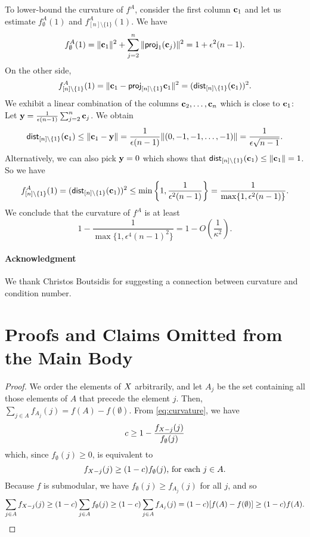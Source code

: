 \documentclass{article}
\theoremstyle{definition}
\begin{document}
To lower-bound the curvature of $f^A$, consider the first column $\mathbf c_1$ and let us estimate $f^A_\emptyset(1)$ and $f^A_{[n]\setminus \{1\}}(1)$. We have
$$ f^A_\emptyset(1) = \| \mathbf c_1 \|^2 + \sum_{j=2}^{n} \| \mathsf{proj}_1(\mathbf c_j) \|^2 = 1 + \epsilon^2 (n-1).$$
On the other side,
$$ f^A_{[n] \setminus \{1\}}(1) = \| \mathbf c_1 - \mathsf{proj}_{[n] \setminus \{1\}} \mathbf c_1 \|^2 = (\mathsf{dist}_{[n] \setminus \{1\}}(\mathbf c_1))^2. $$
We exhibit a linear combination of the columns $\mathbf c_2,\ldots,\mathbf c_n$ which is close to $\mathbf c_1$: Let $\mathbf y = \frac{1}{\epsilon(n-1)} \sum_{j=2}^{n} \mathbf c_j$. 
We obtain
$$ \mathsf{dist}_{[n] \setminus \{1\}} (\mathbf c_1) \leq \| \mathbf c_1 - \mathbf y \| 
 = \frac{1}{\epsilon (n-1)} \| (0,-1,-1,\ldots,-1) \|
= \frac{1}{\epsilon \sqrt{n-1}}.$$
Alternatively, we can also pick $\mathbf y = 0$ which shows that $\mathsf{dist}_{[n] \setminus \{1\}}(\mathbf c_1) \leq \| \mathbf c_1 \| = 1$. So we have
$$ f^A_{[n] \setminus \{1\}}(1) = (\mathsf{dist}_{[n] \setminus \{1\}}(\mathbf c_1))^2  \leq \min \left\{1, \frac{1}{\epsilon^2 (n-1)} \right\} 
 = \frac{1}{\max \{1, \epsilon^2 (n-1) \}}. $$
We conclude that the curvature of $f^A$ is at least $$1 - \frac{1}{\max \{1, \epsilon^4 (n-1)^2\}} = 1 - O\left(\frac{1}{\kappa^2}\right).$$

\paragraph{Acknowledgment}
We thank Christos Boutsidis for suggesting a connection between curvature and condition number.




\appendix



\section{Proofs and Claims Omitted from the Main Body}
\label{sec:omitt-proofs-claims}

\submodcurv*
\begin{proof}
We order the elements of $X$ arbitrarily, and let $A_{j}$ be the set containing all those elements of $A$ that precede the element $j$.  Then, $\sum_{j \in A}f_{A_{j}}(j) = f(A) - f(\emptyset)$.  From \eqref{eq:curvature}, we have
\[
c \ge 1- \frac{f_{X-j}(j)}{f_{\emptyset}(j)}
\]
which, since $f_{\emptyset}(j) \ge 0$, is equivalent to
\[
f_{X-j}(j) \ge (1-c)f_{\emptyset}(j) \text{, for each }j \in A.
\]
Because $f$ is submodular, we have $f_{\emptyset}(j) \ge f_{A_{j}}(j)$ for all $j$,
and so
\begin{equation*}
\sum_{j \in A}f_{X - j}(j) \ge (1-c)\sum_{j \in A}f_{\emptyset}(j) \ge (1-c)\sum_{j\in A}f_{A_{j}}(j)
= (1-c)[f(A) - f(\emptyset)] \ge (1-c)f(A). 
\end{equation*}
\end{proof}
\end{document}
